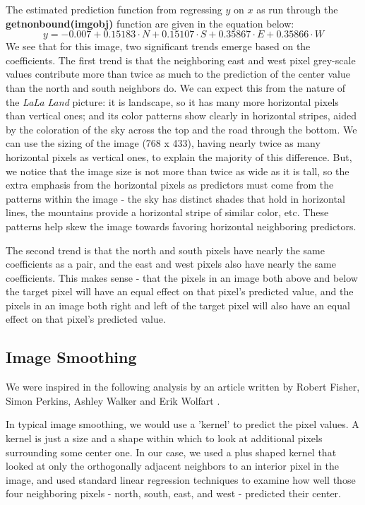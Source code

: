 \documentclass{article}
\begin{document}
The estimated prediction function from regressing $y$ on $x$ as run through the \textbf{getnonbound(imgobj)} function are given in the equation below:
\begin{equation}
y = -0.007 + 0.15183 \cdot N + 0.15107 \cdot S + 0.35867 \cdot E + 0.35866 \cdot W
\end{equation}
We see that for this image, two significant trends emerge based on the coefficients.  The first trend is that the neighboring east and west pixel grey-scale values contribute more than twice as much to the prediction of the center value than the north and south neighbors do.  We can expect this from the nature of the \textit{LaLa Land} picture: it is landscape, so it has many more horizontal pixels than vertical ones; and its color patterns show clearly in horizontal stripes, aided by the coloration of the sky across the top and the road through the bottom.  We can use the sizing of the image (768 x 433), having nearly twice as many horizontal pixels as vertical ones, to explain the majority of this difference.  But, we notice that the image size is not more than twice as wide as it is tall, so the extra emphasis from the horizontal pixels as predictors must come from the patterns within the image - the sky has distinct shades that hold in horizontal lines, the mountains provide a horizontal stripe of similar color, etc.  These patterns help skew the image towards favoring horizontal neighboring predictors.

The second trend is that the north and south pixels have nearly the same coefficients as a pair, and the east and west pixels also have nearly the same coefficients.  This makes sense - that the pixels in an image both above and below the target pixel will have an equal effect on that pixel's predicted value, and the pixels in an image both right and left of the target pixel will also have an equal effect on that pixel's predicted value.

\subsection{Image Smoothing}

We were inspired in the following analysis by an article written by Robert Fisher, Simon Perkins, Ashley Walker and Erik Wolfart \cite{mean-filter}.

In typical image smoothing, we would use a 'kernel' to predict the pixel values.  A kernel is just a size and a shape within which to look at additional pixels surrounding some center one.  In our case, we used a plus shaped kernel that looked at only the orthogonally adjacent neighbors to an interior pixel in the image, and used standard linear regression techniques to examine how well those four neighboring pixels - north, south, east, and west - predicted their center.
\end{document}
